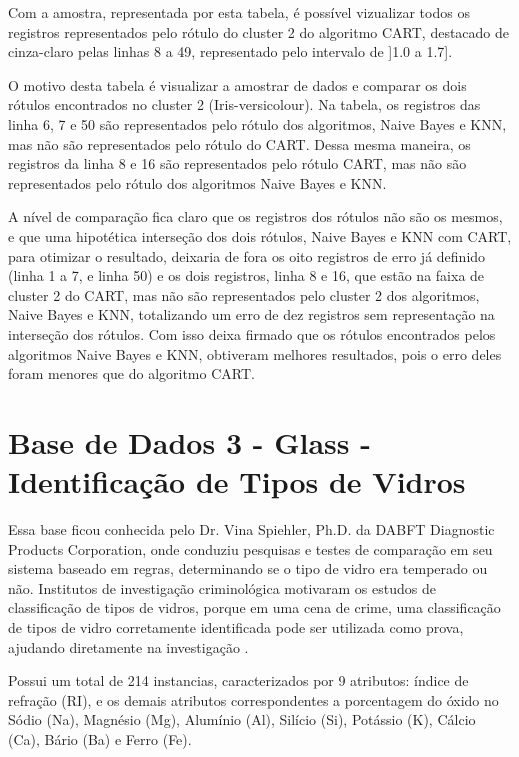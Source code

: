 Com a amostra, representada por esta tabela, é possível vizualizar todos os registros representados pelo rótulo do cluster 2 do algoritmo CART, destacado de cinza-claro pelas linhas 8 a 49, representado pelo intervalo de ]1.0 a 1.7].

O motivo desta tabela é visualizar  a amostrar de dados e comparar os dois rótulos encontrados no cluster 2 (Iris-versicolour). Na tabela, os registros das linha 6, 7 e 50 são representados pelo rótulo dos algoritmos, Naive Bayes e KNN, mas não são representados pelo rótulo do CART. Dessa mesma maneira, os registros da linha 8 e 16 são representados pelo rótulo CART, mas não são representados pelo rótulo dos algoritmos Naive Bayes e KNN. 

A nível de comparação fica claro que os registros dos rótulos não são os mesmos, e que uma hipotética interseção dos dois rótulos, Naive Bayes e KNN com CART, para otimizar o resultado, deixaria de fora os oito registros de erro já definido (linha 1 a 7, e linha 50) e os dois registros, linha 8 e 16, que estão na faixa de cluster 2 do CART, mas não são representados pelo cluster 2 dos algoritmos, Naive Bayes e KNN, totalizando um erro de dez registros sem representação na interseção dos rótulos. Com isso deixa firmado que os rótulos encontrados pelos algoritmos Naive Bayes e KNN, obtiveram melhores resultados, pois o erro deles foram menores que do algoritmo CART.

\section{Base de Dados 3 - Glass - Identificação de Tipos de Vidros}\label{cap:resultados:ssec:iris}

Essa base ficou conhecida pelo Dr. Vina Spiehler, Ph.D. da DABFT Diagnostic Products Corporation, onde conduziu pesquisas e testes de comparação em seu sistema baseado em regras, determinando se o tipo de vidro era temperado ou não. Institutos de investigação criminológica motivaram os estudos de classificação de tipos de vidros, porque em uma cena de crime, uma classificação de tipos de vidro corretamente identificada pode ser utilizada como prova, ajudando diretamente na investigação \cite{Evett:1989}.

Possui um total de 214 instancias, caracterizados por 9 atributos: índice de refração (RI), e os demais atributos correspondentes a porcentagem do óxido no Sódio (Na), Magnésio (Mg), Alumínio (Al), Silício (Si), Potássio (K), Cálcio (Ca), Bário (Ba) e Ferro (Fe).

